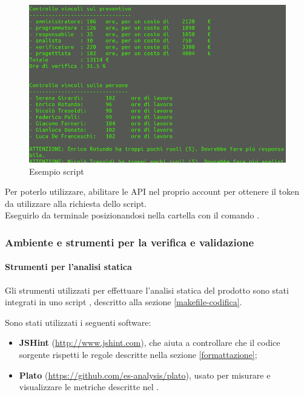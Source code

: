 \begin{figure}[H]
    \centering
    \includegraphics[scale=0.35] {ScriptGantt.png} 
    \caption{Esempio script}
\end{figure}

Per poterlo utilizzare, abilitare le API nel proprio account  per ottenere il token da utilizzare alla richiesta dello script. \\
Eseguirlo da terminale posizionandosi nella cartella  con il comando .

	\subsubsection{Ambiente e strumenti per la verifica e validazione}

	\paragraph{Strumenti per l'analisi statica}
		Gli strumenti utilizzati per effettuare l'analisi statica del prodotto sono stati
	integrati in uno script , descritto alla sezione \ref{makefile-codifica}.
		
		Sono stati utilizzati i seguenti software:
		\begin{itemize}
		\item \textbf{JSHint} (\url{http://www.jshint.com}),  che aiuta a controllare che il codice sorgente rispetti le regole descritte nella sezione \ref{formattazione};
		\item \textbf{Plato} (\url{https://github.com/es-analysis/plato}),  usato per misurare e visualizzare le metriche descritte nel \PianoDiQualifica{}.
		\end{itemize}
		
